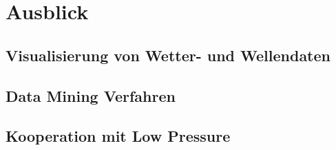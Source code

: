 \chapter{Ausblick}

\section{Visualisierung von Wetter- und Wellendaten}

\section{Data Mining Verfahren}
\section{Kooperation mit Low Pressure}

